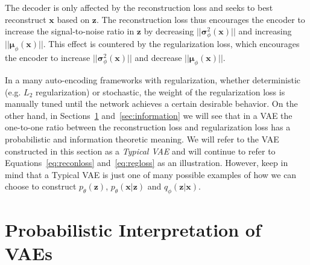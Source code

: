 \documentclass{article}
\begin{document}
The decoder is only affected by the reconstruction loss and seeks to best reconstruct $\mathbf{x}$ based on $\mathbf{z}$. The reconstruction loss thus encourages the encoder to increase the signal-to-noise ratio in $\mathbf{z}$ by decreasing $||\boldsymbol \sigma^2_\phi(\mathbf{x}) ||$  and increasing $||\boldsymbol \mu_\phi(\mathbf{x})||$. This effect is countered by the regularization loss, which encourages the encoder to increase $||\boldsymbol \sigma^2_\phi(\mathbf{x}) ||$ and decrease $||\boldsymbol \mu_\phi(\mathbf{x})||$.

In a many auto-encoding frameworks with regularization,
whether deterministic (e.g. $L_2$ regularization) or stochastic, 
the weight of the regularization loss is manually tuned until the network achieves a certain desirable behavior. 
On the other hand, in Sections~\ref{sec:prob} and~\ref{sec:information} we will see that in a VAE the one-to-one ratio between the reconstruction loss and regularization loss has a probabilistic and information theoretic meaning.
We will refer to the VAE constructed in this section as a \emph{Typical VAE}
and will continue to refer to Equations~\ref{eq:reconloss} and~\ref{eq:regloss} as an illustration.
However, keep in mind that a Typical VAE is just one of many possible examples of how we can choose to construct $p_\theta(\mathbf{z})$, $p_\theta(\mathbf{x}|\mathbf{z})$ and $q_\phi(\mathbf{z}|\mathbf{x})$. 


\section{Probabilistic Interpretation of VAEs}
\label{sec:prob}
\end{document}
